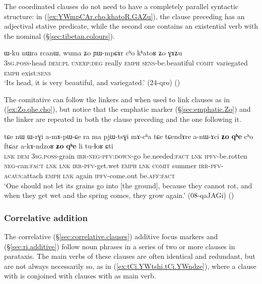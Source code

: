  The coordinated clauses do not need to have a completely parallel syntactic structure: in (\ref{ex:YWmpCAr.cho.khatoR.GAZu}), the clause preceding  has an adjectival stative predicate, while the second one contains an existential verb with the nominal  (§\ref{sec:tibetan.colours}).
 
\begin{exe}
\ex \label{ex:YWmpCAr.cho.khatoR.GAZu}
\gll   ɯ-ku nɯra rcanɯ, wuma ʑo ɲɯ-mpɕɤr cʰo kʰatoʁ ʑo ɣɤʑu \\
\textsc{3sg}.\textsc{poss}-head \textsc{dem}:\textsc{pl} \textsc{unexp}:\textsc{deg} really \textsc{emph} \textsc{sens}-be.beautiful \textsc{comit} variegated \textsc{emph} exist:\textsc{sens} \\
\glt `Its head, it is very beautiful, and variegated.' (24-qro)
()
\end{exe}

The comitative  can follow the linkers  and  when used to link clauses as in (\ref{ex:Zo.qhe.cho}), but notice that the emphatic marker (§\ref{sec:emphatic.Zo}) and the linker  are repeated in both the clause preceding  and the one following it.

\begin{exe}
\ex \label{ex:Zo.qhe.cho}
\gll tɕe nɯ ɯ-rɣi a-mɤ-pɯ-ɕe ra ma pjɯ-tsɣi mɤ-cʰa tɕe tɕendɤre a-nɯ-ɤci \textbf{ʑo} \textbf{qʰe} cʰo ftɕar a-kɤ-ndzoʁ \textbf{ʑo} \textbf{qʰe} li tu-ɬoʁ ɕti \\
\textsc{lnk} \textsc{dem} \textsc{3sg}.\textsc{poss}-grain \textsc{irr}-\textsc{neg}-\textsc{pfv}:\textsc{down}-go be.needed:\textsc{fact} \textsc{lnk} \textsc{ipfv}-be.rotten \textsc{neg}-can:\textsc{fact} \textsc{lnk} \textsc{lnk} \textsc{irr}-\textsc{pfv}-get.wet \textsc{emph} \textsc{lnk} \textsc{comit} summer \textsc{irr}-\textsc{pfv}-\textsc{acaus}:attach \textsc{emph} \textsc{lnk} again \textsc{ipfv}-come.out be.\textsc{aff}:\textsc{fact} \\
\glt `One should not let its grains go into [the ground], because they cannot rot, and when they get wet and the spring comes, they grow again.' (08-qaJAGi)
()
\end{exe}

 \subsubsection{Correlative addition} \label{sec:correlative.addition}
The correlative (§\ref{sec:correlative.clauses}) additive focus markers  and  (§\ref{sec:ri.additive}) follow noun phrases in a series of two or more clauses in parataxis. The main verbs of these clauses are often identical and redundant, but are not always necessarily so, as in (\ref{ex:tCi.YWtshi.tCi.YWndze}), where a clause with  is conjoined with clauses with  as main verb.

